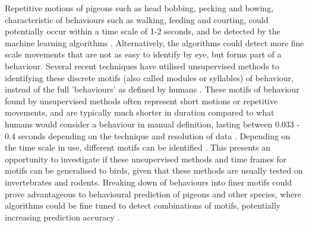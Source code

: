 \documentclass[11pt, letterpaper]{article} %
\begin{document}
\noindent Repetitive motions of pigeons such as head bobbing, pecking and bowing, characteristic of behaviours such as walking, feeding and courting, could potentially occur within a time scale of 1-2 seconds, and be detected by the machine learning algorithms \citep{head-bobbing_1988, shimizu_conspecific_1998, ware_social_2017}. Alternatively, the algorithms could detect more fine scale movements that are not as easy to identify by eye, but forms part of a behaviour. Several recent techniques have utilised unsupervised methods to identifying these discrete motifs (also called modules or syllables) of behaviour, instead of the full 'behaviours' as defined by humans \citep{hsu_b-soid_2021, keypoint-moseq_2024}. These motifs of behaviour found by unsupervised methods often represent short motions or repetitive movements, and are typically much shorter in duration compared to what humans would consider a behaviour in manual definition, lasting between 0.033 - 0.4 seconds depending on the technique and resolution of data \citep{keypoint-moseq_2024}. Depending on the time scale in use, different motifs can be identified \citep{fly_timeseries_2019}. 
%
This presents an opportunity to investigate if these unsupervised methods and time frames for motifs can be generalised to birds, given that these methods are usually tested on invertebrates and rodents. Breaking down of behaviours into finer motifs could prove advantageous to behavioural prediction of pigeons and other species, where algorithms could be fine tuned to detect combinations of motifs, potentially increasing prediction accuracy \citep{luxem_identifying_2022, fazzari_animal_2024}. 


\end{document}
